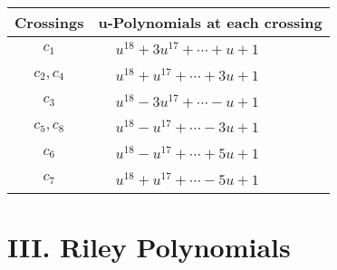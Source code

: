 \documentclass[1p]{elsarticle_modified}
\theoremstyle{definition}
\begin{document}
\begin{tabular}{m{50pt}|m{274pt}}
Crossings & \hspace{64pt}u-Polynomials at each crossing \\
\hline $$\begin{aligned}c_{1}\end{aligned}$$&$\begin{aligned}
&u^{18}+3 u^{17}+\cdots+u+1
\end{aligned}$\\
\hline $$\begin{aligned}c_{2},c_{4}\end{aligned}$$&$\begin{aligned}
&u^{18}+u^{17}+\cdots+3 u+1
\end{aligned}$\\
\hline $$\begin{aligned}c_{3}\end{aligned}$$&$\begin{aligned}
&u^{18}-3 u^{17}+\cdots- u+1
\end{aligned}$\\
\hline $$\begin{aligned}c_{5},c_{8}\end{aligned}$$&$\begin{aligned}
&u^{18}- u^{17}+\cdots-3 u+1
\end{aligned}$\\
\hline $$\begin{aligned}c_{6}\end{aligned}$$&$\begin{aligned}
&u^{18}- u^{17}+\cdots+5 u+1
\end{aligned}$\\
\hline $$\begin{aligned}c_{7}\end{aligned}$$&$\begin{aligned}
&u^{18}+u^{17}+\cdots-5 u+1
\end{aligned}$\\
\hline
\end{tabular}\newpage\renewcommand{\arraystretch}{1}
\centering \section*{ III. Riley Polynomials}
\end{document}
